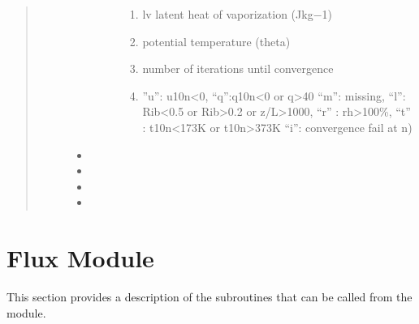 \documentclass[letterpaper,10pt,english]{sphinxmanual}
\begin{document}
\begin{fulllineitems}
\begin{quote}
\begin{description}
\begin{itemize}
\begin{description}
\begin{enumerate}
\item {} 
\sphinxAtStartPar
lv latent heat of vaporization (Jkg−1)

\item {} 
\sphinxAtStartPar
potential temperature (theta)

\item {} 
\sphinxAtStartPar
number of iterations until convergence

\item {} \begin{description}
\sphinxAtStartPar
”u”: u10n\textless{}0, “q”:q10n\textless{}0 or q\textgreater{}40
“m”: missing,
“l”: Rib\textless{}\sphinxhyphen{}0.5 or Rib\textgreater{}0.2 or z/L\textgreater{}1000,
“r” : rh\textgreater{}100\%,
“t” : t10n\textless{}173K or t10n\textgreater{}373K
“i”: convergence fail at n)

\end{description}

\end{enumerate}

\end{description}

\item {} 
\sphinxAtStartPar
{}

\item {} 
\sphinxAtStartPar
{}

\item {} 
\sphinxAtStartPar
{}

\item {} 
\sphinxAtStartPar
{}

\end{itemize}


\end{description}\end{quote}

\end{fulllineitems}



\section{Flux Module}
\label{\detokenize{users_guide:flux-module}}
\sphinxAtStartPar
This section provides a description of the sub\sphinxhyphen{}routines that can be called from the  module.
\end{document}

